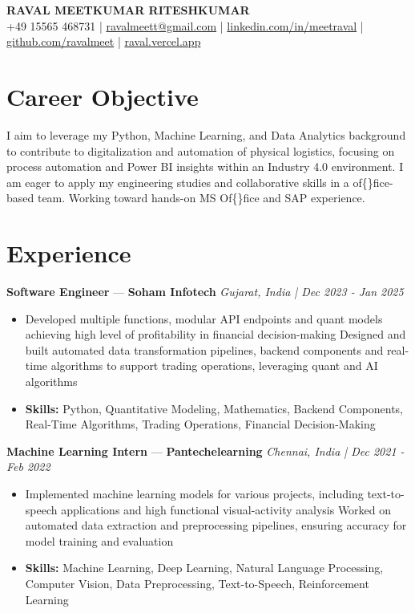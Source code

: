 \documentclass[a4paper,10pt]{article}
\begin{document}
\begin{center}
  {\Large\bfseries RAVAL MEETKUMAR RITESHKUMAR}\\[2pt]
  {\small +49 15565 468731 \;|\; \href{mailto:ravalmeett@gmail.com}{ravalmeett@gmail.com} \;|\; \href{https://www.linkedin.com/in/meetraval/}{linkedin.com/in/meetraval} \;|\; \href{https://github.com/ravalmeet}{github.com/ravalmeet} \;|\; \href{https://raval.vercel.app/}{raval.vercel.app}}
\end{center}
\vspace{-3pt}

\section*{Career Objective}
I aim to leverage my Python, Machine Learning, and Data Analytics background to contribute to digitalization and automation of physical logistics, focusing on process automation and Power BI insights within an Industry 4.0 environment. I am eager to apply my engineering studies and collaborative skills in a of\{\}fice-based team. Working toward hands-on MS Of\{\}fice and SAP experience.\par

\section*{Experience}
\textbf{Software Engineer} — \textbf{Soham Infotech} \hfill \textit{Gujarat, India \;|\; Dec 2023 - Jan 2025}\par
\vspace{1pt}
\begin{itemize}
  \item Developed multiple functions, modular API endpoints and quant models achieving high level of profitability in financial decision-making Designed and built automated data transformation pipelines, backend components and real-time algorithms to support trading operations, leveraging quant and AI algorithms
  \item \textbf{Skills:} Python, Quantitative Modeling, Mathematics, Backend Components, Real-Time Algorithms, Trading Operations, Financial Decision-Making
\end{itemize}
\vspace{3pt}
\textbf{Machine Learning Intern} — \textbf{Pantechelearning} \hfill \textit{Chennai, India \;|\; Dec 2021 - Feb 2022}\par
\vspace{1pt}
\begin{itemize}
  \item Implemented machine learning models for various projects, including text-to-speech applications and high functional visual-activity analysis Worked on automated data extraction and preprocessing pipelines, ensuring accuracy for model training and evaluation
  \item \textbf{Skills:} Machine Learning, Deep Learning, Natural Language Processing, Computer Vision, Data Preprocessing, Text-to-Speech, Reinforcement Learning
\end{itemize}
\end{document}
